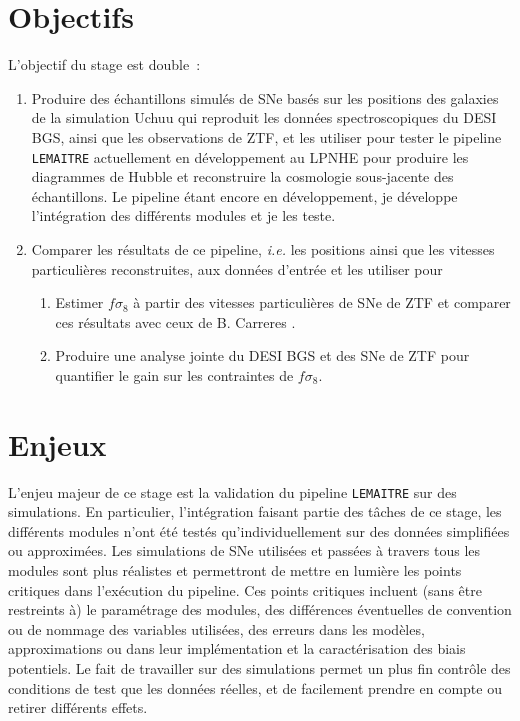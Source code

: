 \documentclass{book}
\def\lemaitre{\texttt{LEMAITRE}\xspace}
\begin{document}
\section{Objectifs}

L'objectif du stage est double~:
\begin{enumerate}
    \item Produire des échantillons simulés de SNe basés sur les positions des galaxies de la simulation Uchuu qui reproduit les données spectroscopiques du DESI BGS, ainsi que les observations de ZTF, et les utiliser pour tester le pipeline \lemaitre actuellement en développement au LPNHE pour produire les diagrammes de Hubble et reconstruire la cosmologie sous-jacente des échantillons. Le pipeline étant encore en développement, je développe l'intégration des différents modules et je les teste.
    \item Comparer les résultats de ce pipeline, \textit{i.e.} les positions ainsi que les vitesses particulières reconstruites, aux données d'entrée et les utiliser pour
    	\begin{enumerate}
		\item Estimer $f \sigma_8$ à partir des vitesses particulières de SNe de ZTF et comparer ces résultats avec ceux de B. Carreres \cite{carreres_growth-rate_2023}.
		\item Produire une analyse jointe du DESI BGS et des SNe de ZTF pour quantifier le gain sur les contraintes de $f\sigma_8$.
	\end{enumerate}
\end{enumerate}

\section{Enjeux}

L'enjeu majeur de ce stage est la validation du pipeline \lemaitre sur des simulations. En particulier, l'intégration faisant partie des tâches de ce stage, les différents modules n'ont été testés qu'individuellement sur des données simplifiées ou approximées. Les simulations de SNe utilisées et passées à travers tous les modules sont plus réalistes et permettront de mettre en lumière les points critiques dans l'exécution du pipeline. Ces points critiques incluent (sans être restreints à) le paramétrage des modules, des différences éventuelles de convention ou de nommage des variables utilisées, des erreurs dans les modèles, approximations ou dans leur implémentation et la caractérisation des biais potentiels.
Le fait de travailler sur des simulations permet un plus fin contrôle des conditions de test que les données réelles, et de facilement prendre en compte ou retirer différents effets.
\end{document}
